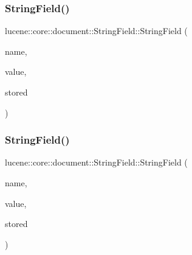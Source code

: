 \mbox{\label{classlucene_1_1core_1_1document_1_1StringField_afec933d8b7bd771b1e00e00e0a5290d0}} 
\subsubsection{\texorpdfstring{String\+Field()}{StringField()}\hspace{0.1cm}{\footnotesize\ttfamily [2/4]}}
{\footnotesize\ttfamily lucene\+::core\+::document\+::\+String\+Field\+::\+String\+Field (\begin{DoxyParamCaption}\item[{\mbox{\hyperlink{ZlibCrc32_8h_a2c212835823e3c54a8ab6d95c652660e}{const}} std\+::string \&}]{name,  }\item[{std\+::string \&\&}]{value,  }\item[{\mbox{\hyperlink{ZlibCrc32_8h_a2c212835823e3c54a8ab6d95c652660e}{const}} \mbox{\hyperlink{classlucene_1_1core_1_1document_1_1Field_a7d5d79f0c56d3548ab8d46d0e7dae35d}{Field\+::\+Store}}}]{stored }\end{DoxyParamCaption})\hspace{0.3cm}{\ttfamily [inline]}}

\mbox{\label{classlucene_1_1core_1_1document_1_1StringField_ac1d3b420656ad92b14efb3c9c955d8a1}} 
\subsubsection{\texorpdfstring{String\+Field()}{StringField()}\hspace{0.1cm}{\footnotesize\ttfamily [3/4]}}
{\footnotesize\ttfamily lucene\+::core\+::document\+::\+String\+Field\+::\+String\+Field (\begin{DoxyParamCaption}\item[{\mbox{\hyperlink{ZlibCrc32_8h_a2c212835823e3c54a8ab6d95c652660e}{const}} std\+::string \&}]{name,  }\item[{\mbox{\hyperlink{ZlibCrc32_8h_a2c212835823e3c54a8ab6d95c652660e}{const}} \mbox{\hyperlink{classlucene_1_1core_1_1util_1_1BytesRef}{lucene\+::core\+::util\+::\+Bytes\+Ref}} \&}]{value,  }\item[{\mbox{\hyperlink{ZlibCrc32_8h_a2c212835823e3c54a8ab6d95c652660e}{const}} \mbox{\hyperlink{classlucene_1_1core_1_1document_1_1Field_a7d5d79f0c56d3548ab8d46d0e7dae35d}{Field\+::\+Store}}}]{stored }\end{DoxyParamCaption})\hspace{0.3cm}{\ttfamily [inline]}}

